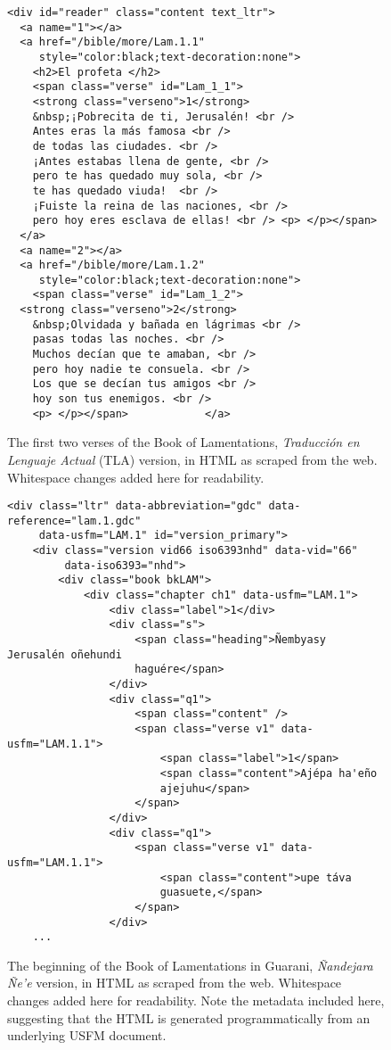 \begin{figure*}
\raggedright \begin{verbatim}
<div id="reader" class="content text_ltr">
  <a name="1"></a>
  <a href="/bible/more/Lam.1.1"
     style="color:black;text-decoration:none">
    <h2>El profeta </h2>
    <span class="verse" id="Lam_1_1">
    <strong class="verseno">1</strong>
    &nbsp;¡Pobrecita de ti, Jerusalén! <br />
    Antes eras la más famosa <br />
    de todas las ciudades. <br />
    ¡Antes estabas llena de gente, <br />
    pero te has quedado muy sola, <br />
    te has quedado viuda!  <br />
    ¡Fuiste la reina de las naciones, <br />
    pero hoy eres esclava de ellas! <br /> <p> </p></span>
  </a>
  <a name="2"></a>
  <a href="/bible/more/Lam.1.2"
     style="color:black;text-decoration:none">
    <span class="verse" id="Lam_1_2">
  <strong class="verseno">2</strong>
    &nbsp;Olvidada y bañada en lágrimas <br />
    pasas todas las noches. <br />
    Muchos decían que te amaban, <br />
    pero hoy nadie te consuela. <br />
    Los que se decían tus amigos <br />
    hoy son tus enemigos. <br />
    <p> </p></span>            </a>
\end{verbatim}
  \caption{The first two verses of the Book of Lamentations, \emph{Traducción en
  Lenguaje Actual} (TLA) version, in HTML as scraped from the web. Whitespace
  changes added here for readability.}
  \label{fig:es-html-sample}
\end{figure*}

\begin{figure*}
\raggedright \begin{verbatim}
<div class="ltr" data-abbreviation="gdc" data-reference="lam.1.gdc"
     data-usfm="LAM.1" id="version_primary">
    <div class="version vid66 iso6393nhd" data-vid="66"
         data-iso6393="nhd">
        <div class="book bkLAM">
            <div class="chapter ch1" data-usfm="LAM.1">
                <div class="label">1</div>
                <div class="s">
                    <span class="heading">Ñembyasy Jerusalén oñehundi
                    haguére</span>
                </div>
                <div class="q1">
                    <span class="content" />
                    <span class="verse v1" data-usfm="LAM.1.1">
                        <span class="label">1</span>
                        <span class="content">Ajépa ha'eño
                        ajejuhu</span>
                    </span>
                </div>
                <div class="q1">
                    <span class="verse v1" data-usfm="LAM.1.1">
                        <span class="content">upe táva
                        guasuete,</span>
                    </span>
                </div>
    ...
\end{verbatim}
  \caption{The beginning of the Book of Lamentations in Guarani,
  \emph{Ñandejara Ñe'e} version, in HTML as scraped from the web. Whitespace
  changes added here for readability. Note the metadata included here,
  suggesting that the HTML is generated programmatically from an underlying
  USFM document.}
  \label{fig:gn-html-sample}
\end{figure*}

